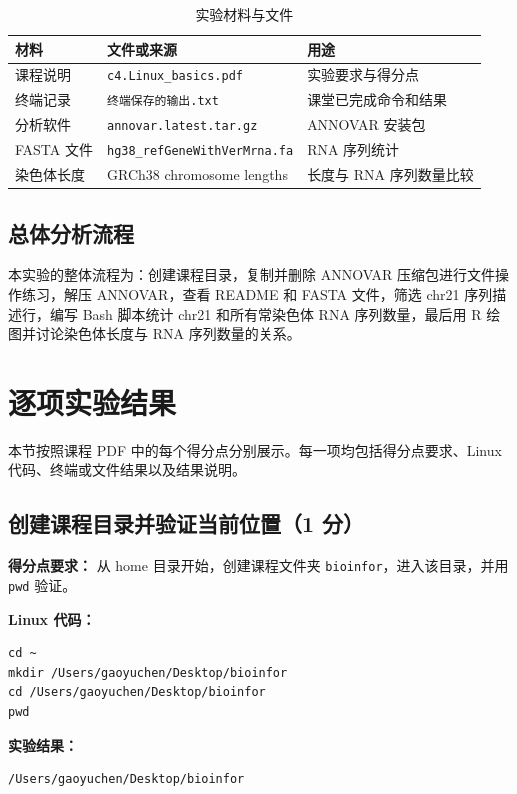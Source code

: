 \documentclass[12pt,a4paper,fontset=fandol]{ctexart}
\begin{document}
\begin{table}[H]
\centering
\caption{实验材料与文件}
\begin{tabular}{lll}
\toprule
材料 & 文件或来源 & 用途 \\
\midrule
课程说明 & \texttt{c4.Linux\_basics.pdf} & 实验要求与得分点 \\
终端记录 & \texttt{终端保存的输出.txt} & 课堂已完成命令和结果 \\
分析软件 & \texttt{annovar.latest.tar.gz} & ANNOVAR 安装包 \\
FASTA 文件 & \texttt{hg38\_refGeneWithVerMrna.fa} & RNA 序列统计 \\
染色体长度 & GRCh38 chromosome lengths & 长度与 RNA 序列数量比较 \\
\bottomrule
\end{tabular}
\end{table}

\subsection{总体分析流程}

本实验的整体流程为：创建课程目录，复制并删除 ANNOVAR 压缩包进行文件操作练习，解压 ANNOVAR，查看 README 和 FASTA 文件，筛选 chr21 序列描述行，编写 Bash 脚本统计 chr21 和所有常染色体 RNA 序列数量，最后用 R 绘图并讨论染色体长度与 RNA 序列数量的关系。

\section{逐项实验结果}

本节按照课程 PDF 中的每个得分点分别展示。每一项均包括得分点要求、Linux 代码、终端或文件结果以及结果说明。

\subsection{创建课程目录并验证当前位置（1 分）}

\noindent\textbf{得分点要求：} 从 home 目录开始，创建课程文件夹 \texttt{bioinfor}，进入该目录，并用 \texttt{pwd} 验证。

\noindent\textbf{Linux 代码：}
\begin{lstlisting}[style=linuxcode]
cd ~
mkdir /Users/gaoyuchen/Desktop/bioinfor
cd /Users/gaoyuchen/Desktop/bioinfor
pwd
\end{lstlisting}

\noindent\textbf{实验结果：}
\begin{lstlisting}[style=resultcode]
/Users/gaoyuchen/Desktop/bioinfor
\end{lstlisting}
\end{document}
